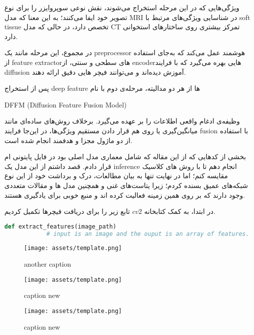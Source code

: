 \documentclass[a4paper,12pt]{article}
\begin{document}
 ویژگی‌هایی که در این مرحله استخراج می‌شوند، نقش نوعی سوپروایزر را برای نوع تصویر خود ایفا می‌کنند؛ به این معنا که مدل MRI در شناسایی ویژگی‌های مرتبط با soft tissue تخصص دارد، در حالی که مدل CT تمرکز بیشتری روی ساختارهای استخوانی دارد.
 
 در مجموع، این مرحله مانند یک preprocessor هوشمند عمل می‌کند که به‌جای استفاده از feature extractorهای سطحی و سنتی، از encoderهایی بهره می‌گیرد که با فرایند diffusion آموزش دیده‌اند و می‌توانند فیچر ‌هایی دقیق ارائه دهند.
 
 پس از استخراج deep feature
 ها از هر دو مدالیته، مرحله‌ی دوم با نام 
 \begin{latin}
DFFM (Diffusion Feature Fusion Model) 
 \end{latin}
 
 
 وظیفه‌ی ادغام واقعی اطلاعات را بر عهده می‌گیرد. برخلاف روش‌های ساده‌ای مانند میانگین‌گیری یا روی هم قرار دادن مستقیم ویژگی‌ها، در این‌جا فرایند fusion با استفاده از دو ماژول مجزا و هدفمند انجام شده است.
 

بخشی از کدهایی که از این مقاله که شامل معماری مدل اصلی بود در فایل پایتونی ام قرار دادم.
قصد داشتم از این مدل یک inference انجام دهم تا با روش های کلاسیک مقایسه کنم؛ اما در نهایت تنها به بیان مطالعات، درک و برداشت خود از این نوع شبکه‌های عمیق بسنده کردم؛ زیرا  یتاست‌های غنی و همچنین مدل‌ ها و مقالات متعددی وجود دارند که بر روی همین زمینه فعالیت کرده اند و منبع خوبی برای یادگیری هستند.
	\pagebreak
	
	در ابتدا، به کمک کتابخانه 
	$cv2$
	تابع زیر را برای دریافت فیچرها تکمیل کردیم. 
	
	\begin{latin}
		\begin{lstlisting}[language=Python, caption={extract feature function}]
			def extract_features(image_path)
			# input is an image and the ouput is an array of features.
		\end{lstlisting}
	\end{latin}
	
	


	\begin{figure}[ht]
		\centering
		\begin{minipage}[t]{0.32\textwidth}
			\centering
			\texttt{[image: assets/template.png]}
			\caption{\textcolor{CustomAccent}{another caption}}
		\end{minipage}
		\hfill
		\begin{minipage}[t]{0.32\textwidth}
			\centering
			\texttt{[image: assets/template.png]}
			\caption{\textcolor{CustomAccent}{caption new}}
		\end{minipage}
		\vspace{1em}
		\hfill
		\begin{minipage}[t]{0.32\textwidth}
			\centering
			\texttt{[image: assets/template.png]}
			\caption{\textcolor{CustomAccent}{caption new}}
		\end{minipage}
		\vspace{1em}
	\end{figure}
	
\end{document}
